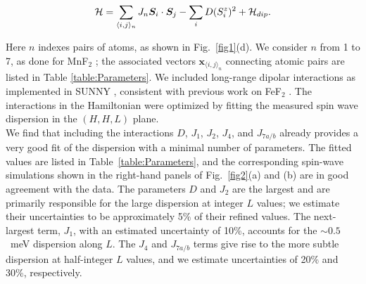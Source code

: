 \documentclass[aps, prl, twocolumn, superscriptaddress, longbibliography]{revtex4-2}
\begin{document}
\begin{equation}
{\cal H} = \sum_{\langle i, j \rangle_n} J_n \bm{S}_i \cdot \bm{S}_j - \sum_i D (S_i^z)^2 + {\cal H}_{dip} .
\end{equation}

Here $n$ indexes pairs of atoms, as shown in Fig.~\ref{fig1}(d). We consider $n$ from 1 to 7, as done for MnF$_2$ \cite{faure2025_mnf2_neutron}; the associated vectors $\bm{x}_{\langle i, j \rangle_n}$ connecting atomic pairs are listed in Table \ref{table:Parameters}. We included long-range dipolar interactions as implemented in SUNNY \cite{dahlbom2025sunnyjljuliapackagespin}, consistent with previous work on FeF$_2$ \cite{Hutchings1970_fef2_spinwave}. The interactions in the Hamiltonian were optimized by fitting the measured spin wave dispersion in the $(H,H,L)$ plane. \\

We find that including the interactions $D$, $J_1$, $J_2$, $J_4$, and $J_{7a/b}$ already provides a very good fit of the dispersion with a minimal number of parameters. The fitted values are listed in Table~\ref{table:Parameters}, and the corresponding spin-wave simulations shown in the right-hand panels of Fig.~\ref{fig2}(a) and (b) are in good agreement with the data. The parameters $D$ and $J_2$ are the largest and are primarily responsible for the large dispersion at integer $L$ values; we estimate their uncertainties to be approximately 5\% of their refined values. The next-largest term, $J_1$, with an estimated uncertainty of 10\%, accounts for the $\sim 0.5$~meV dispersion along $L$. The $J_4$ and $J_{7a/b}$ terms give rise to the more subtle dispersion at half-integer $L$ values, and we estimate uncertainties of 20\% and 30\%, respectively. \\
\end{document}
